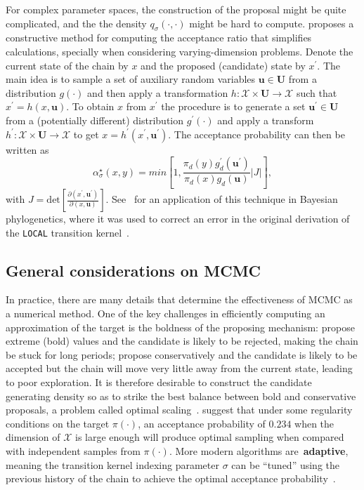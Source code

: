 For complex parameter spaces, the construction of the proposal might be quite complicated, and the the density  $q_\sigma(\cdot, \cdot)$ might be hard to compute.
\cite{Green2003} proposes a constructive method for computing the acceptance ratio that simplifies calculations, specially when considering varying-dimension problems.
Denote the current state of the chain by $x$ and the proposed (candidate) state by $x^\prime$.
The main idea is to sample a set of auxiliary random variables $\boldsymbol u \in \boldsymbol U$ from a distribution $g(\cdot)$ and then apply a transformation $h : \mathcal{X} \times \boldsymbol U \to \mathcal{X} $ such that $x^\prime = h(x, \boldsymbol u)$.
To obtain $x$ from $x^\prime$ the procedure is to generate a set $\boldsymbol u^\prime \in \boldsymbol U$ from a (potentially different) distribution $g^\prime(\cdot)$ and apply a transform $h^\prime : \mathcal{X} \times \boldsymbol U \to \mathcal{X}$ to get $x = h^\prime(x^\prime, \boldsymbol u^\prime)$.
The acceptance probability can then be written as 
\[
 \alpha^\star_\sigma(x, y) = min \left[1, \frac{\pi_d(y) g_d^\prime(\boldsymbol u^\prime)}{\pi_d(x) g_d(\boldsymbol u)} |J| \right],
\]
with $J = \text{det} \left[\frac{\partial (x^\prime, \boldsymbol u^\prime) }{\partial (x, \boldsymbol u)} \right]$.
See~\cite{Holder2005} for an application of this technique in Bayesian phylogenetics, where it was used to correct an error in the original derivation of the \verb|LOCAL| transition kernel~\citep{Larget1999}.


\subsection{General considerations on MCMC}
\label{sec:practical}

In practice, there are many details that determine the effectiveness of MCMC as a numerical method.
One of the key challenges in efficiently computing an approximation of the target is the boldness of the proposing mechanism: propose extreme (bold) values and the candidate is likely to be rejected, making the chain be stuck for long periods; propose conservatively and the candidate is likely to be accepted but the chain will move very little away from the current state, leading to poor exploration.
It is therefore desirable to construct the candidate generating density so as to strike the best balance between bold and conservative proposals, a problem called optimal scaling~\citep{Roberts1998,Roberts2001}.
\cite{Gelman1996} suggest that under some regularity conditions on the target $\pi(\cdot)$, an acceptance probability of $0.234$ when the dimension of $\mathcal{X}$ is large enough will produce optimal sampling when compared with independent samples from $\pi(\cdot)$. 
More modern algorithms are~\textbf{adaptive}, meaning the transition kernel indexing parameter $\sigma$ can be ``tuned'' using the previous history of the chain to achieve the optimal acceptance probability~\citep{Haario2001}.

